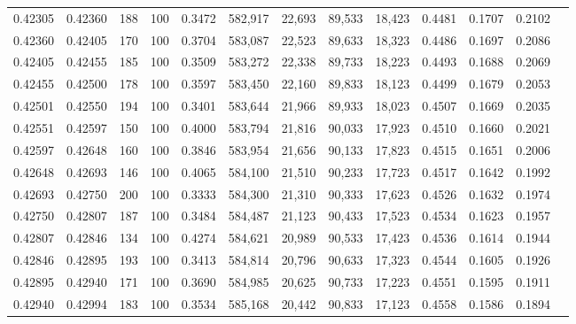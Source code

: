 \begin{tabular}{rrrrrrrrrrrrr}
0.42305 & 0.42360 &   188 & 100 &                                     0.3472 & 582,917 &  22,693 &  89,533 &  18,423 & 0.4481 & 0.1707 & 0.2102 \\
0.42360 & 0.42405 &   170 & 100 &                                     0.3704 & 583,087 &  22,523 &  89,633 &  18,323 & 0.4486 & 0.1697 & 0.2086 \\
0.42405 & 0.42455 &   185 & 100 &                                     0.3509 & 583,272 &  22,338 &  89,733 &  18,223 & 0.4493 & 0.1688 & 0.2069 \\
0.42455 & 0.42500 &   178 & 100 &                                     0.3597 & 583,450 &  22,160 &  89,833 &  18,123 & 0.4499 & 0.1679 & 0.2053 \\
0.42501 & 0.42550 &   194 & 100 &                                     0.3401 & 583,644 &  21,966 &  89,933 &  18,023 & 0.4507 & 0.1669 & 0.2035 \\
0.42551 & 0.42597 &   150 & 100 &                                     0.4000 & 583,794 &  21,816 &  90,033 &  17,923 & 0.4510 & 0.1660 & 0.2021 \\
0.42597 & 0.42648 &   160 & 100 &                                     0.3846 & 583,954 &  21,656 &  90,133 &  17,823 & 0.4515 & 0.1651 & 0.2006 \\
0.42648 & 0.42693 &   146 & 100 &                                     0.4065 & 584,100 &  21,510 &  90,233 &  17,723 & 0.4517 & 0.1642 & 0.1992 \\
0.42693 & 0.42750 &   200 & 100 &                                     0.3333 & 584,300 &  21,310 &  90,333 &  17,623 & 0.4526 & 0.1632 & 0.1974 \\
0.42750 & 0.42807 &   187 & 100 &                                     0.3484 & 584,487 &  21,123 &  90,433 &  17,523 & 0.4534 & 0.1623 & 0.1957 \\
0.42807 & 0.42846 &   134 & 100 &                                     0.4274 & 584,621 &  20,989 &  90,533 &  17,423 & 0.4536 & 0.1614 & 0.1944 \\
0.42846 & 0.42895 &   193 & 100 &                                     0.3413 & 584,814 &  20,796 &  90,633 &  17,323 & 0.4544 & 0.1605 & 0.1926 \\
0.42895 & 0.42940 &   171 & 100 &                                     0.3690 & 584,985 &  20,625 &  90,733 &  17,223 & 0.4551 & 0.1595 & 0.1911 \\
0.42940 & 0.42994 &   183 & 100 &                                     0.3534 & 585,168 &  20,442 &  90,833 &  17,123 & 0.4558 & 0.1586 & 0.1894 \\

\end{tabular}
